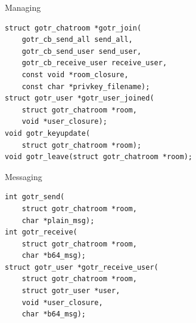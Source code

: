 \begin{frame}[fragile]{Managing}
	\begin{lstlisting}
struct gotr_chatroom *gotr_join(
    gotr_cb_send_all send_all,
    gotr_cb_send_user send_user,
    gotr_cb_receive_user receive_user,
    const void *room_closure,
    const char *privkey_filename);
struct gotr_user *gotr_user_joined(
    struct gotr_chatroom *room,
    void *user_closure);
void gotr_keyupdate(
    struct gotr_chatroom *room);
void gotr_leave(struct gotr_chatroom *room);
	\end{lstlisting}
\end{frame}

\begin{frame}[fragile]{Messaging}
	\begin{lstlisting}
int gotr_send(
    struct gotr_chatroom *room,
    char *plain_msg);
int gotr_receive(
    struct gotr_chatroom *room,
    char *b64_msg);
struct gotr_user *gotr_receive_user(
    struct gotr_chatroom *room,
    struct gotr_user *user,
    void *user_closure,
    char *b64_msg);
	\end{lstlisting}
\end{frame}
